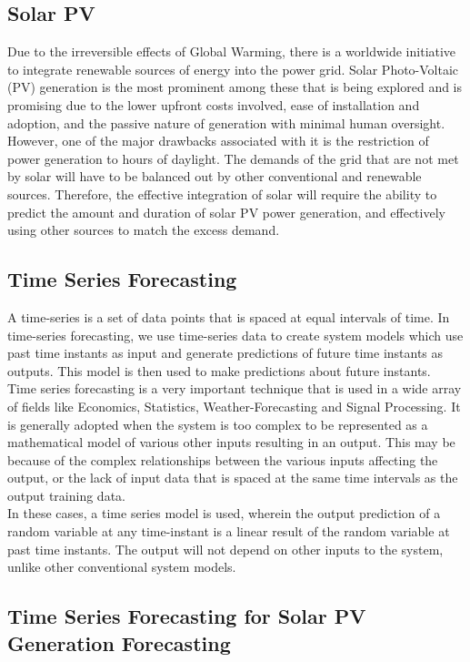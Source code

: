 \documentclass[journal]{IEEEtran}
\begin{document}
\subsection{Solar PV}
Due to the irreversible effects of Global Warming, there is a worldwide initiative to integrate renewable sources of energy into the power grid. Solar Photo-Voltaic (PV) generation is the most prominent among these that is being explored and is promising due to the lower upfront costs involved, ease of installation and adoption, and the passive nature of generation with minimal human oversight. However, one of the major drawbacks associated with it is the restriction of power generation to hours of daylight. The demands of the grid that are not met by solar will have to be balanced out by other conventional and renewable sources. Therefore, the effective integration of solar will require the ability to predict the amount and duration of solar PV power generation, and effectively using other sources to match the excess demand.

\subsection{Time Series Forecasting}

A time-series is a set of data points that is spaced at equal intervals of time. In time-series forecasting, we use time-series data to create system models which use past time instants as input and generate predictions of future time instants as outputs. This model is then used to make predictions about future instants.
\\
Time series forecasting is a very important technique that is used in a wide array of fields like Economics, Statistics, Weather-Forecasting and Signal Processing. It is generally adopted when the system is too complex to be represented as a mathematical model of various other inputs resulting in an output. This may be because of the complex relationships between the various inputs affecting the output, or the lack of input data that is spaced at the same time intervals as the output training data. \cite{gagniuc2017markov}
\\
In these cases, a time series model is used, wherein the output prediction of a random variable at any time-instant is a linear result of the random variable at past time instants. The output will not depend on other inputs to the system, unlike other conventional system models.


\subsection{Time Series Forecasting for Solar PV Generation Forecasting}
\end{document}
